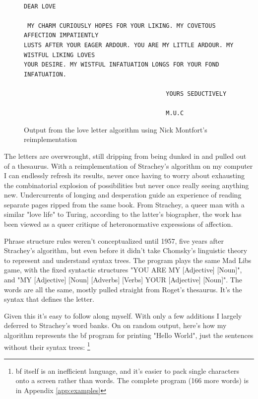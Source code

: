 \documentclass[runningheads]{llncs}
\begin{document}
\begin{figure}
	\centering
    \begin{verbatim}

DEAR LOVE

 MY CHARM CURIOUSLY HOPES FOR YOUR LIKING. MY COVETOUS AFFECTION IMPATIENTLY
LUSTS AFTER YOUR EAGER ARDOUR. YOU ARE MY LITTLE ARDOUR. MY WISTFUL LIKING LOVES
YOUR DESIRE. MY WISTFUL INFATUATION LONGS FOR YOUR FOND INFATUATION.

                                        YOURS SEDUCTIVELY

                                        M.U.C\end{verbatim}
		\caption{Output from the love letter algorithm using Nick Montfort's reimplementation}\label{fig:muc}
\end{figure}
The letters are overwrought, still dripping from being dunked in and pulled out of a thesaurus. With a reimplementation \cite{montfort2014} of Strachey's algorithm on my computer I can endlessly refresh its results, never once having to worry about exhausting the combinatorial explosion of possibilities but never once really seeing anything new. Undercurrents of longing and desperation guide an experience of reading separate pages ripped from the same book. From Strachey, a queer man with a similar "love life" to Turing, according to the latter's biographer, \cite{hodges1992}
the work has been viewed as a queer critique of heteronormative expressions of affection.

Phrase structure rules weren't conceptualized until 1957, five years after Strachey's algorithm, but even before it didn't take Chomsky's linguistic theory to represent and understand syntax trees. The program plays the same Mad Libs game, with the fixed syntactic structures "YOU ARE MY [Adjective] [Noun]", and "MY [Adjective] [Noun] [Adverbs] [Verbs] YOUR [Adjective] [Noun]". The words are all the same, mostly pulled straight from Roget's thesaurus. It's the syntax that defines the letter.

Given this it's easy to follow along myself. With only a few additions I largely deferred to Strachey's word banks. On on random output, here's how my algorithm represents the bf program for printing "Hello World", just the sentences without their syntax trees:
\footnote{bf itself is an inefficient language, and it's easier to pack single characters onto a screen rather than words. The complete program (166 more words) is in Appendix \ref{app:examples}}
\end{document}
